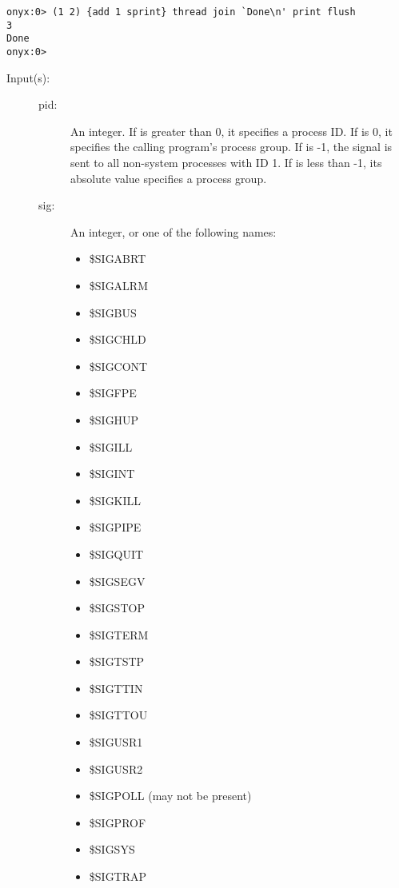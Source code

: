 \begin{description}
\begin{description}
\begin{verbatim}
onyx:0> (1 2) {add 1 sprint} thread join `Done\n' print flush
3
Done
onyx:0>
		\end{verbatim}
	\end{description}
\label{systemdict:kill}
\item[{\onyxop{pid sig}{kill}{--}}: ]
	\begin{description}\item[]
	\item[Input(s): ]
		\begin{description}\item[]
		\item[pid: ]
			An integer.  If  is greater than 0, it
			specifies a process ID.  If  is 0, it
			specifies the calling program's process group.  If
			 is -1, the signal is sent to all non-system
			processes with ID 1.  If  is less than -1,
			its absolute value specifies a process group.
		\item[sig: ]
			An integer, or one of the following names:
			\begin{itemize}
 			\item{\$SIGABRT}
 			\item{\$SIGALRM}
 			\item{\$SIGBUS}
 			\item{\$SIGCHLD}
 			\item{\$SIGCONT}
 			\item{\$SIGFPE}
 			\item{\$SIGHUP}
 			\item{\$SIGILL}
 			\item{\$SIGINT}
 			\item{\$SIGKILL}
 			\item{\$SIGPIPE}
 			\item{\$SIGQUIT}
 			\item{\$SIGSEGV}
 			\item{\$SIGSTOP}
 			\item{\$SIGTERM}
 			\item{\$SIGTSTP}
 			\item{\$SIGTTIN}
 			\item{\$SIGTTOU}
 			\item{\$SIGUSR1}
 			\item{\$SIGUSR2}
 			\item{\$SIGPOLL (may not be present)}
 			\item{\$SIGPROF}
 			\item{\$SIGSYS}
 			\item{\$SIGTRAP}

\end{itemize}
\end{description}
\end{description}
\end{description}
